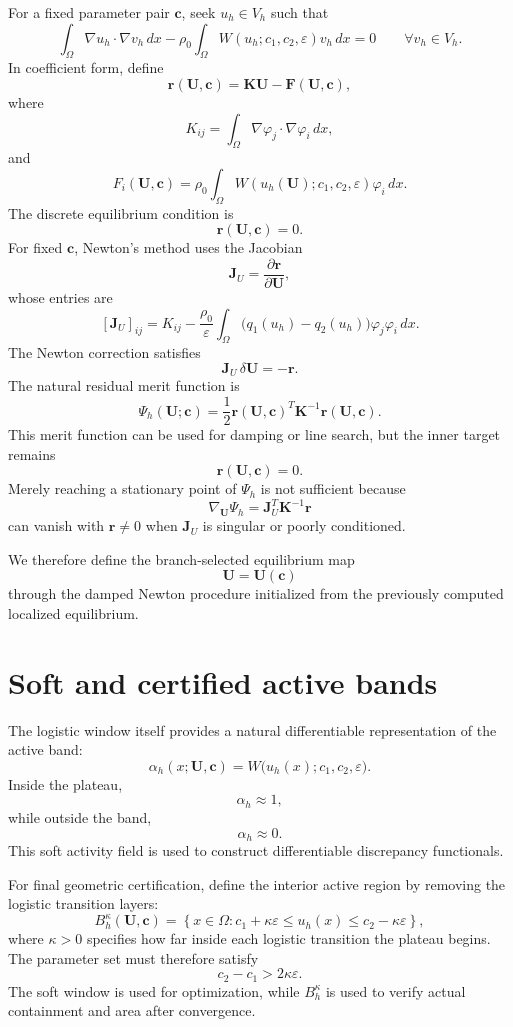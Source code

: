 \documentclass[11pt]{article}
\newcommand{\bU}{\mathbf{U}}
\newcommand{\bc}{\mathbf{c}}
\newcommand{\br}{\mathbf{r}}
\newcommand{\bK}{\mathbf{K}}
\newcommand{\bF}{\mathbf{F}}
\newcommand{\bJ}{\mathbf{J}}
\begin{document}
For a fixed parameter pair $\bc$, seek $u_h\in V_h$ such that
\[
\int_\Omega \nabla u_h\cdot\nabla v_h\,dx
-
\rho_0
\int_\Omega
W(u_h;c_1,c_2,\varepsilon)v_h\,dx
=
0
\qquad
\forall v_h\in V_h.
\]
In coefficient form, define
\[
\br(\bU,\bc)
=
\bK\bU-\bF(\bU,\bc),
\]
where
\[
K_{ij}
=
\int_\Omega
\nabla\varphi_j\cdot\nabla\varphi_i\,dx,
\]
and
\[
F_i(\bU,\bc)
=
\rho_0
\int_\Omega
W(u_h(\bU);c_1,c_2,\varepsilon)
\varphi_i\,dx.
\]
The discrete equilibrium condition is
\[
\boxed{\br(\bU,\bc)=0.}
\]
For fixed $\bc$, Newton's method uses the Jacobian
\[
\bJ_U
=
\frac{\partial\br}{\partial\bU},
\]
whose entries are
\[
[\bJ_U]_{ij}
=
K_{ij}
-
\frac{\rho_0}{\varepsilon}
\int_\Omega
\bigl(q_1(u_h)-q_2(u_h)\bigr)
\varphi_j\varphi_i\,dx.
\]
The Newton correction satisfies
\[
\bJ_U\,\delta\bU
=
-\br.
\]
The natural residual merit function is
\[
\Psi_h(\bU;\bc)
=
\frac12
\br(\bU,\bc)^T
\bK^{-1}
\br(\bU,\bc).
\]
This merit function can be used for damping or line search, but the inner target remains
\[
\br(\bU,\bc)=0.
\]
Merely reaching a stationary point of $\Psi_h$ is not sufficient because
\[
\nabla_{\bU}\Psi_h
=
\bJ_U^T\bK^{-1}\br
\]
can vanish with $\br\neq0$ when $\bJ_U$ is singular or poorly conditioned.

We therefore define the branch-selected equilibrium map
\[
\bU=\bU(\bc)
\]
through the damped Newton procedure initialized from the previously computed localized equilibrium.

\section{Soft and certified active bands}

The logistic window itself provides a natural differentiable representation of the active band:
\[
\alpha_h(x;\bU,\bc)
=
W\bigl(u_h(x);c_1,c_2,\varepsilon\bigr).
\]
Inside the plateau,
\[
\alpha_h\approx1,
\]
while outside the band,
\[
\alpha_h\approx0.
\]
This soft activity field is used to construct differentiable discrepancy functionals.

For final geometric certification, define the interior active region by removing the logistic transition layers:
\[
B_h^\kappa(\bU,\bc)
=
\left\{
x\in\Omega:
c_1+\kappa\varepsilon
\leq u_h(x)\leq
c_2-\kappa\varepsilon
\right\},
\]
where $\kappa>0$ specifies how far inside each logistic transition the plateau begins.
The parameter set must therefore satisfy
\[
c_2-c_1>2\kappa\varepsilon.
\]
The soft window is used for optimization, while $B_h^\kappa$ is used to verify actual containment and area after convergence.
\end{document}
